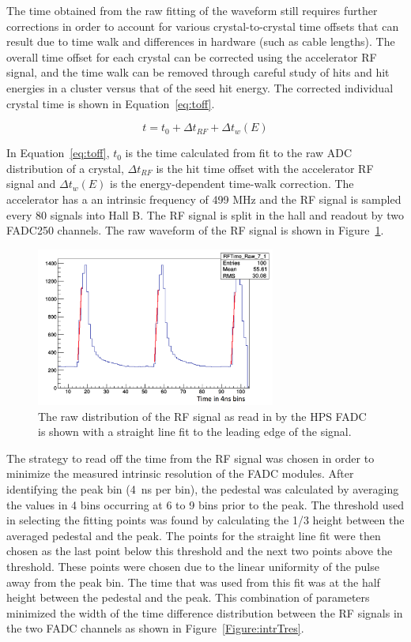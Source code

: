The time obtained from the raw fitting of the waveform still requires further corrections in order to account for various crystal-to-crystal time offsets that can result due to time walk and differences in hardware (such as cable lengths). The overall time offset for each crystal can be corrected using the accelerator RF signal, and the time walk can be removed through careful study of hits and hit energies in a cluster versus that of the seed hit energy. The corrected individual crystal time is shown in Equation~\eqref{eq:toff}.

\begin{equation}
	\label{eq:toff}
	t = t_0 +\Delta t_{RF} + \Delta t_w (E)
\end{equation}

In Equation~\eqref{eq:toff}, $t_0$ is the time calculated from fit to the raw ADC distribution of a crystal, $\Delta t_{RF}$ is the hit time offset with the accelerator RF signal and $\Delta t_w(E)$ is the energy-dependent time-walk correction. The accelerator has a an intrinsic frequency of 499 MHz and the RF signal is sampled every 80 signals into Hall B. The RF signal is split in the hall and readout by two FADC250 channels. The raw waveform of the RF signal is shown in Figure~\ref{Figure:rfFits}. 

\begin{figure}[H]
  \centering
      \includegraphics[width=0.7\textwidth]{pics/performance/rfFits.png}
  \caption[Fitted, raw waveform of the RF signal in HPS]{The raw distribution of the RF signal as read in by the HPS FADC is shown with a straight line fit to the leading edge of the signal.}
  \label{Figure:rfFits}
\end{figure}

The strategy to read off the time from the RF signal was chosen in order to minimize the measured intrinsic resolution of the FADC modules. After identifying the peak bin (4~ns per bin), the pedestal was calculated by
averaging the values in 4 bins occurring at 6 to 9 bins prior to the peak. The threshold used in selecting the fitting points was found by calculating the 1/3 height between the averaged pedestal and the peak. The points for the straight line fit were then chosen as the last point below this threshold and the next two points above the threshold. These points were chosen due to the linear uniformity of the pulse away from the
peak bin. The time that was used from this fit was at the half height between the pedestal and the peak. This combination of parameters minimized the width of the time difference distribution between the RF signals in the two FADC channels as shown in Figure~\ref{Figure:intrTres}. 

